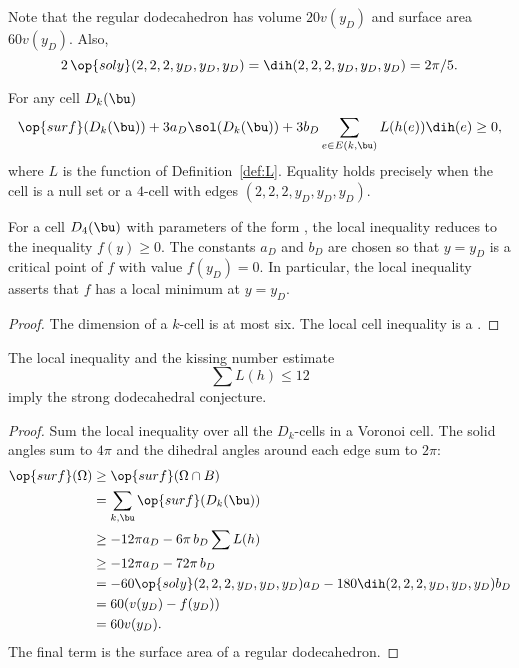 Note that the regular dodecahedron has volume $20 v(y_D)$ and surface
area $60 v(y_D)$.  Also,
\begin{equation}
  2\,\op{soly}(2,2,2,y_D,y_D,y_D) =\dih(2,2,2,y_D,y_D,y_D)=2\pi/5.
\end{equation}
%
%

\begin{lemma}\label{lemma:D-local}
For any cell $D_k(\bu)$
\[
  \op{surf}(D_k(\bu)) + 3 a_D \sol(D_k(\bu)) 
+ 3 b_D \sum_{e\in E(k,\bu)} L(h(e)) \dih(e) \ge 0,
\]
where $L$ is the function of Definition~\ref{def:L}.  Equality holds
precisely when the cell is a null set or a $4$-cell with edges
$(2,2,2,y_D,y_D,y_D)$.
\end{lemma}
%



For a cell $D_4(\bu)$ with parameters of the form
  , the local inequality reduces to the inequality
  $f(y)\ge 0$.  The constants $a_D$ and $b_D$ are chosen so that
  $y=y_D$ is a critical point of $f$ with value $f(y_D)=0$.  In
  particular, the local inequality asserts that $f$ has a local
  minimum at $y=y_D$.


\begin{proof} 
  The dimension of a $k$-cell is at most six.  The local cell
  inequality is a \cc{}.  
\end{proof}

\begin{remark}
\end{remark}

\begin{lemma}[]
  The local inequality and the kissing number estimate 
\[
\sum L(h) \le 12
\]
imply the strong dodecahedral conjecture.
\end{lemma}

\begin{proof} 
  Sum the local inequality over all the $D_k$-cells in a Voronoi cell.
  The solid angles sum to $4\pi$ and the dihedral angles around each
  edge sum to $2\pi$:
\begin{align*}
  \op{surf}(\Omega) &\ge \op{surf}(\Omega\cap B)\\
  &=\sum_{k,\bu} \op{surf}(D_k(\bu))\\
  &\ge -12\pi a_D - 6\pi\, b_D  \sum L(h)\\
  &\ge -12\pi a_D - 72\pi\, b_D\\
  &= -60 \op{soly}(2,2,2,y_D,y_D,y_D) a_D - 180 \dih(2,2,2,y_D,y_D,y_D) b_D\\
  &= 60 (v(y_D) - f(y_D))\\
  &= 60 v(y_D).\\
\end{align*}
The final term is the surface area of a regular dodecahedron.
\end{proof}

